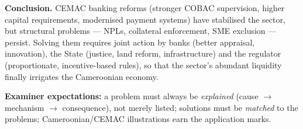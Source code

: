 \documentclass[11pt]{article}
\begin{document}
\begin{corrige}
\textbf{Conclusion.} CEMAC banking reforms (stronger COBAC supervision, higher capital requirements, modernised payment systems) have stabilised the sector, but structural problems — NPLs, collateral enforcement, SME exclusion — persist. Solving them requires joint action by banks (better appraisal, innovation), the State (justice, land reform, infrastructure) and the regulator (proportionate, incentive-based rules), so that the sector's abundant liquidity finally irrigates the Cameroonian economy.

\textbf{Examiner expectations:} a problem must always be \emph{explained} (cause $\rightarrow$ mechanism $\rightarrow$ consequence), not merely listed; solutions must be \emph{matched} to the problems; Cameroonian/CEMAC illustrations earn the application marks.
\end{corrige}
\end{document}
